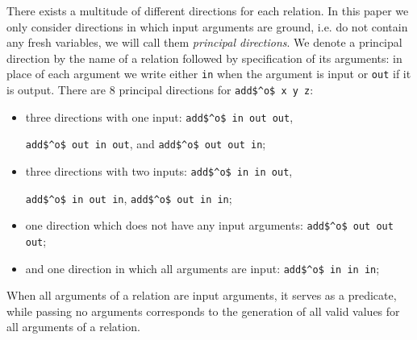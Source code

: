 There exists a multitude of different directions for each relation.
In this paper we only consider directions in which input arguments are ground, i.e. do not contain any fresh variables, we will call them \emph{principal directions}.
We denote a principal direction by the name of a relation followed by specification of its arguments: in place of each argument we write either \lstinline{in} when the argument is input or \lstinline{out} if it is output.
There are $8$ principal directions for \lstinline{add$^o$ x y z}:
\begin{itemize}
  \item three directions with one input: \lstinline{add$^o$ in out out},

  \lstinline{add$^o$ out in out}, and \lstinline{add$^o$ out out in};
  \item three directions with two inputs: \lstinline{add$^o$ in in out},

  \lstinline{add$^o$ in out in}, \lstinline{add$^o$ out in in};
  \item one direction which does not have any input arguments:
  \lstinline{add$^o$ out out out};
  \item and one direction in which all arguments are input:
  \lstinline{add$^o$ in in in};
\end{itemize}

When all arguments of a relation are input arguments, it serves as a predicate, while passing no arguments corresponds to the generation of all valid values for all arguments of a relation.


